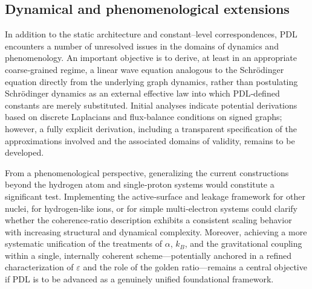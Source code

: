 \documentclass[11pt,a4paper]{article}
\begin{document}
\subsection{Dynamical and phenomenological extensions}
In addition to the static architecture and constant–level correspondences, PDL encounters a number of unresolved issues in the domains of dynamics and phenomenology.\cite{Laubscher2026SchrodingerSketch,Laubscher2026SchrodingerPDL} An important objective is to derive, at least in an appropriate coarse‑grained regime, a linear wave equation analogous to the Schrödinger equation directly from the underlying graph dynamics, rather than postulating Schrödinger dynamics as an external effective law into which PDL‑defined constants are merely substituted.\cite{Laubscher2026SchrodingerSketch} Initial analyses indicate potential derivations based on discrete Laplacians and flux‑balance conditions on signed graphs; however, a fully explicit derivation, including a transparent specification of the approximations involved and the associated domains of validity, remains to be developed.\cite{Laubscher2026SchrodingerSketch,Laubscher2026TopologicalReformulation}

From a phenomenological perspective, generalizing the current constructions beyond the hydrogen atom and single‑proton systems would constitute a significant test. Implementing the active‑surface and leakage framework for other nuclei, for hydrogen‑like ions, or for simple multi‑electron systems could clarify whether the coherence‑ratio description exhibits a consistent scaling behavior with increasing structural and dynamical complexity.\cite{Laubscher2026Alpha,Laubscher2026CombinatorialProton} Moreover, achieving a more systematic unification of the treatments of $\alpha$, $k_B$, and the gravitational coupling within a single, internally coherent scheme—potentially anchored in a refined characterization of $\varepsilon$ and the role of the golden ratio—remains a central objective if PDL is to be advanced as a genuinely unified foundational framework.\cite{Laubscher2026FullPDL,Laubscher2026Alpha,Laubscher2026TopologicalReformulation}
\end{document}
